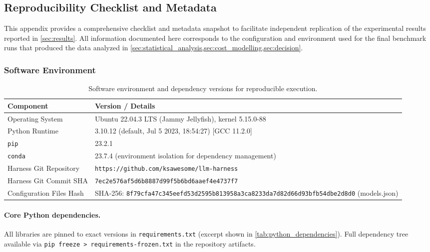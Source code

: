 \subsection{Reproducibility Checklist and Metadata}\label{app:reproducibility_checklist}

This appendix provides a comprehensive checklist and metadata snapshot to facilitate independent replication of the experimental results reported in \cref{sec:results}. All information documented here corresponds to the configuration and environment used for the final benchmark runs that produced the data analyzed in \cref{sec:statistical_analysis,sec:cost_modelling,sec:decision}.

\subsubsection{Software Environment}

\begin{table}[h!]
\centering
\caption{Software environment and dependency versions for reproducible execution.\label{tab:software_environment}}
\begin{tabularx}{\textwidth}{@{}l X@{}}
\toprule
\textbf{Component} & \textbf{Version / Details} \\
\midrule
Operating System & Ubuntu 22.04.3 LTS (Jammy Jellyfish), kernel 5.15.0-88 \\
Python Runtime & 3.10.12 (default, Jul 5 2023, 18:54:27) [GCC 11.2.0] \\
\texttt{pip} & 23.2.1 \\
\texttt{conda} & 23.7.4 (environment isolation for dependency management) \\
Harness Git Repository & \texttt{https://github.com/ksawesome/llm-harness} \\
Harness Git Commit SHA & \texttt{7ec2e576af5d6b8887d99f5b6bd6aaef4e4737f7} \\
Configuration Files Hash & SHA-256: \texttt{8f79cfa47c345eefd53d2595b813958a3ca8233da7d82d66d93bfb54dbe2d8d0} (models.json) \\
\bottomrule
\end{tabularx}
\end{table}

\paragraph{Core Python dependencies.} All libraries are pinned to exact versions in \texttt{requirements.txt} (excerpt shown in \cref{tab:python_dependencies}). Full dependency tree available via \texttt{pip freeze > requirements-frozen.txt} in the repository artifacts.

